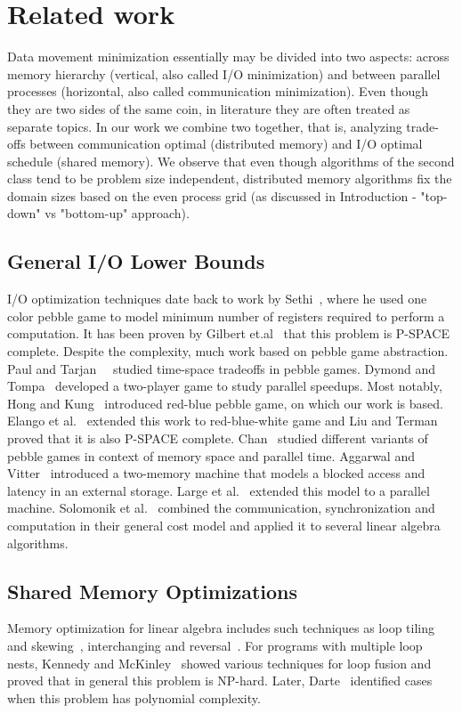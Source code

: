 \documentclass[sigplan,review,anonymous]{acmart}\settopmatter{printfolios=true,printccs=false,printacmref=false}
\begin{document}
\section{Related work}

Data movement minimization essentially may be divided into two aspects: across 
memory hierarchy (vertical, also called I/O minimization) and between parallel 
processes (horizontal, also called communication minimization). Even though 
they are two sides of the same coin, in literature they are often treated as 
separate topics. In our work we combine two together, that is, analyzing 
trade-offs between 
communication optimal (distributed memory) and I/O optimal schedule 
(shared memory). We observe that even though algorithms of the second class 
tend to be problem size independent, distributed memory algorithms fix the 
domain sizes based on the even process grid (as discussed in Introduction - 
"top-down" vs "bottom-up" approach).

\subsection{General I/O Lower Bounds}
I/O optimization techniques date back to work by 
Sethi~\cite{completeRegisterProblems}, where he used one color pebble game to 
model minimum number of registers required to perform a computation. It has 
been proven by Gilbert et.al~\cite{pebblegameregister} that this problem is 
P-SPACE complete. Despite the complexity, much work based on pebble game 
abstraction. Paul and Tarjan~~\cite{pebbleTradeoffs} studied time-space 
tradeoffs in pebble games. Dymond and Tompa~\cite{dymond2playerpebblegame} 
developed a 
two-player game to study parallel speedups. Most notably, Hong and 
Kung~\cite{redblue} introduced red-blue pebble game, on which our work is 
based. Elango et al.~\cite{redbluewhite} extended this work to red-blue-white 
game and Liu and Terman~\cite{redblueHard} proved that it is also P-SPACE 
complete. Chan~\cite{justApebbleGame} studied different variants of pebble 
games in context of memory space and parallel time. Aggarwal and 
Vitter~\cite{externalMem}
introduced a two-memory machine that models a blocked access and latency in an
external storage. Large et al.~\cite{parallelExMem} extended this model to a 
parallel machine. Solomonik et al.~\cite{edgarTradeoff} combined the 
communication, synchronization and computation in their general cost model and 
applied 
it to several linear algebra algorithms.

\subsection{Shared Memory Optimizations}
Memory optimization for linear algebra includes such techniques as loop tiling 
and skewing~\cite{tiling}, interchanging and reversal~\cite{tiling2}. For 
programs with multiple loop nests, Kennedy and McKinley~\cite{loopFusion} 
showed various techniques for loop fusion and proved that in general this 
problem is NP-hard. Later, 
Darte~\cite{loopFusionComplexity} identified cases when this problem has 
polynomial complexity.
\end{document}
